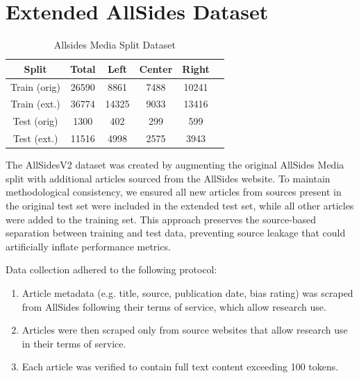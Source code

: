 \chapter{Extended AllSides Dataset}
\label{appendix:extended_dataset}

\begin{table}[ht]
\centering
\small 
\begin{tabular}{c c c c c c}
\toprule
\textbf{Split} & \textbf{Total} & \textbf{Left} & \textbf{Center} & \textbf{Right} \\
\midrule
 Train (orig) & 26590 & 8861 & 7488 & 10241 \\
 Train (ext.) & 36774 & 14325 & 9033 & 13416 \\
 Test (orig) & 1300  & 402 & 299 & 599 \\
 Test (ext.) & 11516 & 4998 & 2575 & 3943 \\
\bottomrule
\end{tabular}
\caption{Allsides Media Split Dataset}
\label{tab:media_split_dataset}
\end{table}

The AllSidesV2 dataset was created by augmenting the original AllSides Media split with additional articles sourced from the AllSides website. To maintain methodological consistency, we ensured all new articles from sources present in the original test set were included in the extended test set, while all other articles were added to the training set. This approach preserves the source-based separation between training and test data, preventing source leakage that could artificially inflate performance metrics. 

Data collection adhered to the following protocol:

\begin{enumerate}
    \item Article metadata (e.g. title, source, publication date, bias rating) was scraped from AllSides following their terms of service, which allow research use.
    \item Articles were then scraped only from source websites that allow research use in their terms of service.
    \item Each article was verified to contain full text content exceeding 100 tokens.
\end{enumerate}

